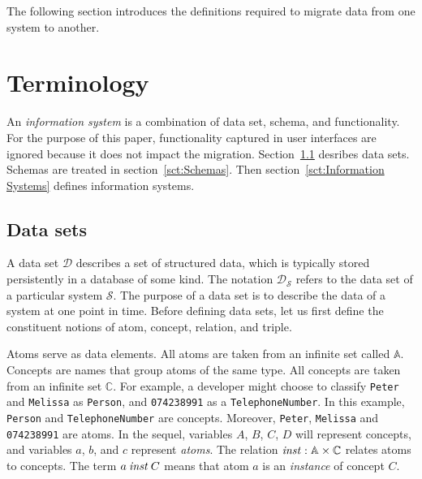 \documentclass[runningheads]{llncs}
\newcommand{\id}[1]{\text{\it #1\/}}
\newcommand{\instance}{\mathbin{\id{inst}}}
\newcommand{\Pair}[2]{#1\times#2}
\newcommand{\atom}[1]{{\tt\small #1}}
\newcommand{\Atoms}{\mathbb{A}}
\newcommand{\concept}[1]{{\tt\small #1}}
\newcommand{\Concepts}{\mathbb{C}}
\newcommand{\dataset}{\mathscr{D}}
\newcommand{\infsys}{\mathscr{S}}
\begin{document}
   The following section introduces the definitions required to migrate data from one system to another.

\section{Terminology}
\label{sct:Terminology}
   An {\em information system} is a combination of data set, schema, and functionality.
   For the purpose of this paper, functionality captured in user interfaces are ignored because it does not impact the migration.
   Section~\ref{sct:Data sets} desribes data sets. Schemas are treated in section~\ref{sct:Schemas}.
   Then section~\ref{sct:Information Systems} defines information systems.

\subsection{Data sets}
\label{sct:Data sets}
   A data set $\dataset$ describes a set of structured data, which is typically stored persistently in a database of some kind.
   The notation $\dataset_{\infsys}$ refers to the data set of a particular system $\infsys$.
   The purpose of a data set is to describe the data of a system at one point in time. 
   Before defining data sets, let us first define the constituent notions of atom, concept, relation, and triple.
   
   Atoms serve as data elements.
   All atoms are taken from an infinite set called $\Atoms$.
   Concepts are names that group atoms of the same type.
   All concepts are taken from an infinite set $\Concepts$.
   For example, a developer might choose to classify \atom{Peter} and \atom{Melissa} as \concept{Person},
   and \atom{074238991} as a \concept{TelephoneNumber}.
   In this example, \concept{Person} and \concept{TelephoneNumber} are concepts.
   Moreover, \atom{Peter}, \atom{Melissa} and \atom{074238991} are atoms.
   In the sequel, variables $A$, $B$, $C$, $D$ will represent concepts, and variables $a$, $b$, and $c$ represent \emph{atoms}.
   The relation $\instance:\Pair{\Atoms}{\Concepts}$ relates atoms to concepts.
   The term $a\instance C$ means that atom $a$ is an \emph{instance} of concept $C$.
\end{document}
